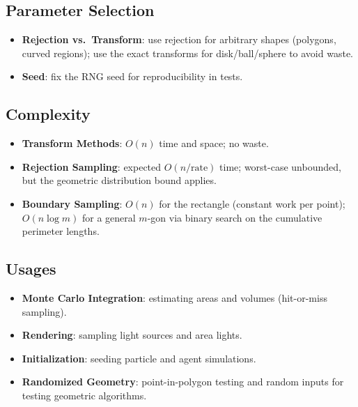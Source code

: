\subsection{Parameter Selection}
\begin{itemize}
    \item \textbf{Rejection vs.\ Transform}: use rejection for arbitrary
      shapes (polygons, curved regions); use the exact transforms for
      disk/ball/sphere to avoid waste.
    \item \textbf{Seed}: fix the RNG seed for reproducibility in tests.
\end{itemize}

\subsection{Complexity}
\begin{itemize}
    \item \textbf{Transform Methods}: $O(n)$ time and space; no waste.
    \item \textbf{Rejection Sampling}: expected $O(n / \text{rate})$ time;
      worst-case unbounded, but the geometric distribution bound applies.
    \item \textbf{Boundary Sampling}: $O(n)$ for the rectangle (constant work
      per point); $O(n \log m)$ for a general $m$-gon via binary search on the
      cumulative perimeter lengths.
\end{itemize}

\subsection{Usages}
\begin{itemize}
    \item \textbf{Monte Carlo Integration}: estimating areas and volumes
      (hit-or-miss sampling).
    \item \textbf{Rendering}: sampling light sources and area lights.
    \item \textbf{Initialization}: seeding particle and agent simulations.
    \item \textbf{Randomized Geometry}: point-in-polygon testing and random
      inputs for testing geometric algorithms.
\end{itemize}


